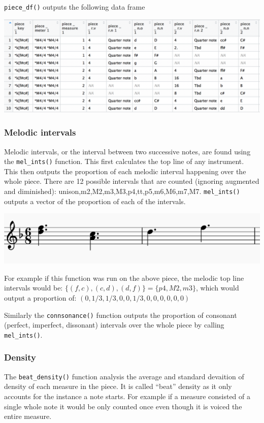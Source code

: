 \documentclass[12pt,twoside]{reedthesis}
\theoremstyle{definition}
\theoremstyle{definition}
\theoremstyle{definition}
\theoremstyle{remark}
\begin{document}
\texttt{piece\_df()} outputs the following data frame

\includegraphics[width=0.75\linewidth]{images/ex1r}

\subsubsection{Melodic intervals}\label{melodic-intervals}

Melodic intervals, or the interval between two successive notes, are
found using the \texttt{mel\_ints()} function. This first calculates the
top line of any instrument. This then outputs the proportion of each
melodic interval happening over the whole piece. There are 12 possible
intervals that are counted (ignoring augmented and diminished):
unison,m2,M2,m3,M3,p4,tt,p5,m6,M6,m7,M7. \texttt{mel\_ints()} outputs a
vector of the proportion of each of the intervals.

\includegraphics{images/ex2.png}

For example if this function was run on the above piece, the melodic top
line intervals would be: \(\{(f,c),(c,d),(d,f)\} = \{p4,M2,m3\}\), which
would output a proportion of: \((0,1/3,1/3,0,0,1/3,0,0,0,0,0,0)\)

Similarly the \texttt{connsonance()} function outputs the proportion of
consonant (perfect, imperfect, dissonant) intervals over the whole piece
by calling \texttt{mel\_ints()}.

\subsubsection{Density}\label{density}

The \texttt{beat\_density()} function analysis the average and standard
devaition of density of each measure in the piece. It is called ``beat''
density as it only accounts for the instance a note starts. For example
if a measure consisted of a single whole note it would be only counted
once even though it is voiced the entire measure.
\end{document}
